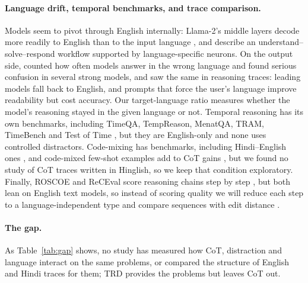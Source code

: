 \documentclass[11pt]{article}
\begin{document}
\paragraph{Language drift, temporal benchmarks, and trace comparison.}
Models seem to pivot through English internally: Llama-2's middle layers decode more readily to English than to the input language \citep{wendler-etal-2024-llamas}, and \citet{zhao2024handle} describe an understand--solve--respond workflow supported by language-specific neurons. On the output side, \citet{marchisio-etal-2024-understanding} counted how often models answer in the wrong language and found serious confusion in several strong models, and \citet{qi-etal-2025-models} saw the same in reasoning traces: leading models fall back to English, and prompts that force the user's language improve readability but cost accuracy. Our target-language ratio measures whether the model's reasoning stayed in the given language or not. Temporal reasoning has its own benchmarks, including TimeQA, TempReason, MenatQA, TRAM, TimeBench and Test of Time \citep{chen2021timeqa,tan-etal-2023-towards,wei-etal-2023-menatqa,wang-zhao-2024-tram,chu-etal-2024-timebench,fatemi2025test}, but they are English-only and none uses controlled distractors. Code-mixing has benchmarks, including Hindi--English ones \citep{khanuja-etal-2020-gluecos,aguilar-etal-2020-lince,yang-chai-2025-codemixbench}, and code-mixed few-shot examples add to CoT gains \citep{shankar-etal-2024-context}, but we found no study of CoT traces written in Hinglish, so we keep that condition exploratory. Finally, ROSCOE and ReCEval score reasoning chains step by step \citep{golovneva2023roscoe,prasad-etal-2023-receval}, but both lean on English text models, so instead of scoring quality we will reduce each step to a language-independent type and compare sequences with edit distance \citep{levenshtein1966binary}.

\paragraph{The gap.}
As Table~\ref{tab:gap} shows, no study has measured how CoT, distraction and language interact on the same problems, or compared the structure of English and Hindi traces for them; TRD provides the problems but leaves CoT out.
\end{document}
